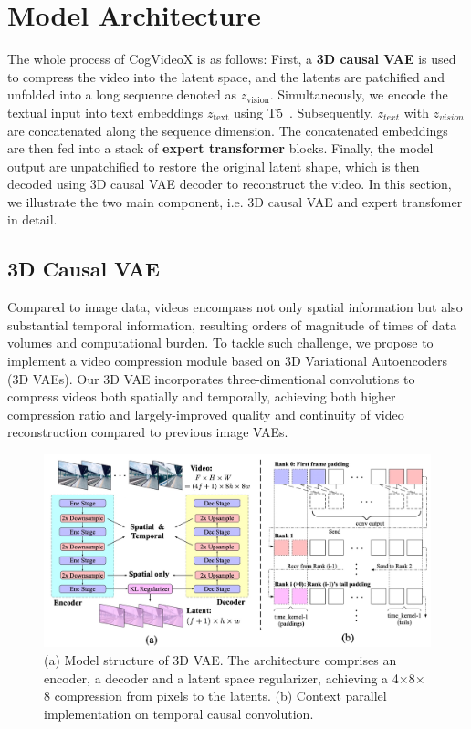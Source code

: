 \section{Model Architecture}\label{sec:model}

The whole process of CogVideoX is as follows: First, a \textbf{3D causal VAE} is used to compress the video into the latent space, and the latents are patchified and unfolded into a long sequence denoted as $z_{\text{vision}}$.
Simultaneously, we encode the textual input into text embeddings $z_{\text{text}}$ using T5~\citep{raffel2020exploring}. Subsequently, $z_{text}$ with $z_{vision}$ are concatenated along the sequence dimension. The concatenated embeddings are then fed into a stack of \textbf{expert transformer} blocks.
Finally, the model output are unpatchified to restore the original latent shape, which is then decoded using 3D causal VAE decoder to reconstruct the video. In this section, we illustrate the two main component, i.e. 3D causal VAE and expert transfomer in detail.

\subsection{3D Causal VAE} 

Compared to image data, videos encompass not only spatial information but also substantial temporal information, resulting orders of magnitude of times of data volumes and computational burden. To tackle such challenge, we propose to implement a video compression module based on 3D Variational Autoencoders (3D VAEs). Our 3D VAE incorporates three-dimentional convolutions to compress videos both spatially and temporally, achieving both higher compression ratio and largely-improved quality and continuity of video reconstruction compared to previous image VAEs.

\begin{figure}[h]
\begin{center}
\includegraphics[width=\linewidth]{images/3dvae_combined.jpg}
\end{center}
\caption{(a) Model structure of 3D VAE. The architecture comprises an encoder, a decoder and a latent space regularizer, achieving a 4$\times$8$\times$8 compression from pixels to the latents. (b) Context parallel implementation on temporal causal convolution.}
\label{fig:3dvae_combined}
\end{figure}

